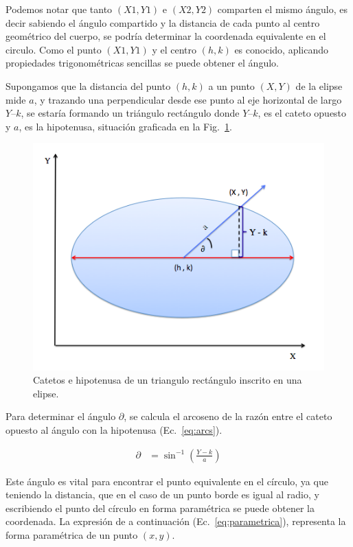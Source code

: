 Podemos notar que tanto $(X1,Y1)$ e $(X2,Y2)$ comparten el mismo ángulo,
es decir sabiendo el ángulo compartido y la distancia de cada punto al
centro geométrico del cuerpo, se podría determinar la coordenada
equivalente en el circulo. Como el punto $(X1,Y1)$ y el centro $(h,k)$ es
conocido, aplicando propiedades trigonométricas sencillas se puede
obtener el ángulo. 

Supongamos que la distancia del punto $(h,k)$ a un punto $(X,Y)$ de la
elipse mide $a$, y trazando una perpendicular desde ese punto al eje
horizontal de largo $Y – k$, se estaría formando un triángulo rectángulo
donde $Y – k$, es el cateto opuesto y $a$, es la hipotenusa, situación
graficada en la Fig.~\ref{img:triaElipse}.

\begin{figure}[hb!]
  \begin{center}
    \includegraphics[scale=.5]{image/triaElipse}
  \end{center}
  \caption{Catetos e hipotenusa de un triangulo rectángulo inscrito en
  una elipse.}\label{img:triaElipse}
\end{figure}

Para determinar el ángulo $\partial$, se calcula el arcoseno de la razón entre
el cateto opuesto al ángulo con la hipotenusa (Ec.~\ref{eq:arcs}).

\begin{align}
  \partial & = \sin^{-1}\left(\frac{Y - k}{a}\right) \label{eq:arcs}
\end{align}

Este ángulo es vital para encontrar el punto equivalente en el
círculo, ya que teniendo la distancia, que en el caso de un punto
borde es igual al radio, y escribiendo el punto del círculo en forma
paramétrica se puede obtener la coordenada. La expresión de a
continuación (Ec.~\ref{eq:parametrica}), representa la forma
paramétrica de un punto $(x,y)$.


